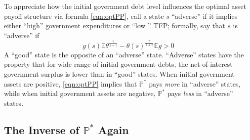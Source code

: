 \documentclass[12pt]{article}
\newcommand{\EE}{\mathbb E}
\begin{document}
To appreciate how  the initial government debt level influences the optimal asset payoff structure via formula \eqref{eqn:optPP}, call a
 state $s$ ``adverse''  if it implies either ``high'' government expenditures or ``low '' TFP; formally, say that  $s$ is ``adverse'' if
\[   g(s)\EE \theta^\frac{\gamma}{1+\gamma}-\theta(s)^\frac\gamma{1+\gamma}\EE g >0\]
A ``good'' state is the opposite of an ``adverse'' state.  ``Adverse'' states have the property that for  wide range of initial government debts, the net-of-interest government surplus is lower than in ``good'' states.  When initial government assets are positive, \eqref{eqn:optPP} implies that  $\mathbb{P}^*$   pays {\em more} in ``adverse'' states, while when initial government assets are negative, $\mathbb{P}^*$  pays {\em less} in ``adverse'' states.

%
%		
%	
%			

\subsection{The Inverse of $\mathbb P^*$ Again}\label{sec:David42} %
\end{document}
